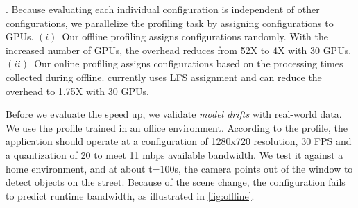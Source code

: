 . Because
evaluating each individual configuration is independent of other configurations,
we parallelize the profiling task by assigning configurations to GPUs.
$(i)$~Our offline profiling assigns configurations randomly.  With the increased
number of GPUs, the overhead reduces from 52X to 4X with 30 GPUs.  $(ii)$~Our
online profiling assigns configurations based on the processing times collected
during offline.  \sysname{} currently uses LFS assignment and can reduce the
overhead to 1.75X with 30 GPUs.

Before we evaluate the speed up, we validate \textit{model drifts} with
real-world data. We use the profile trained in an office environment.  According
to the profile, the application should operate at a configuration of 1280x720
resolution, 30 FPS and a quantization of 20 to meet 11 mbps available bandwidth.
We test it against a home environment, and at about t=100s, the camera points
out of the window to detect objects on the street. Because of the scene change,
the configuration fails to predict runtime bandwidth, as illustrated in
\autoref{fig:offline}.


